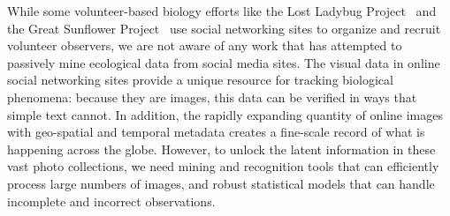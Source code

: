 While some volunteer-based biology efforts like the Lost Ladybug
Project~\cite{lostladybug} and the Great Sunflower
Project~\cite{greatsunflower} use social networking sites to
organize and recruit volunteer observers, we are not aware of any
work that has attempted to passively mine ecological data from social media
sites. The visual data in online social networking sites provide a
unique resource for tracking biological phenomena:  because they are
images, this data can be verified in ways that simple text 
cannot.  In addition, the rapidly expanding quantity
of online images with geo-spatial and temporal metadata creates a
fine-scale record of what is happening across the globe.  However, to
unlock the latent information in these vast photo collections, we need
 mining and recognition tools that can efficiently
process large numbers of images, and robust statistical models that
can handle incomplete and incorrect observations.

